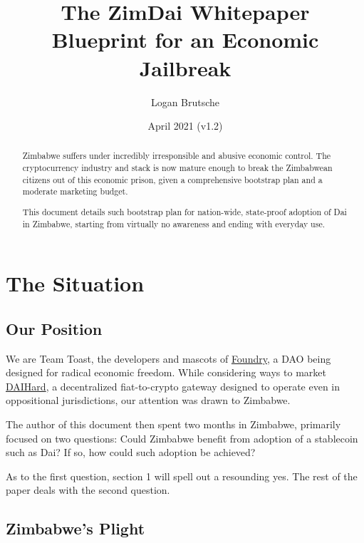 \documentclass{article}
\title{The ZimDai Whitepaper\\
	\large Blueprint for an Economic Jailbreak
}
\date{April 2021 (v1.2)}
\author{Logan Brutsche}
\begin{document}

\maketitle
\begin{abstract}
	\setlength{\parskip}{1em}
	Zimbabwe suffers under incredibly irresponsible and abusive economic control. The cryptocurrency industry and stack is now mature enough to break the Zimbabwean citizens out of this economic prison, given a comprehensive bootstrap plan and a moderate marketing budget.
		
	This document details such bootstrap plan for nation-wide, state-proof adoption of Dai in Zimbabwe, starting from virtually no awareness and ending with everyday use.
\end{abstract}

\newpage
{}
\tableofcontents

\setlength{\parskip}{0.5em}

\newpage
{}
\section{The Situation} \label{situation}

\subsection{Our Position} \label{position}

We are Team Toast, the developers and mascots of \href{foundrydao.com}{Foundry}, a DAO being designed for radical economic freedom. While considering ways to market \href{https://foundrydao.com/products}{DAIHard}, a decentralized fiat-to-crypto gateway designed to operate even in oppositional jurisdictions, our attention was drawn to Zimbabwe.

The author of this document then spent two months in Zimbabwe, primarily focused on two questions: Could Zimbabwe benefit from adoption of a stablecoin such as Dai? If so, how could such adoption be achieved?

As to the first question, section 1 will spell out a resounding yes. The rest of the paper deals with the second question.

\subsection{Zimbabwe's Plight} \label{zimbabwe}
\end{document}
